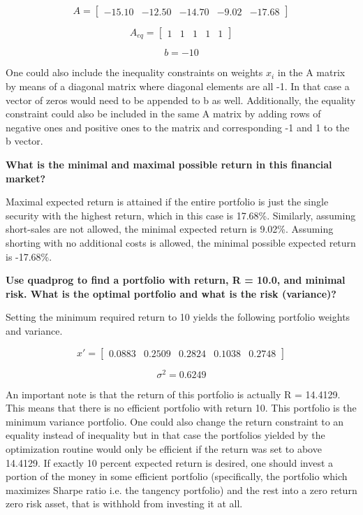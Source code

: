 \[A= \begin{bmatrix}
 	-15.10 & -12.50 & -14.70 & -9.02 & -17.68
\end{bmatrix}
\]

\[A_{eq}= \begin{bmatrix}
 	1 & 1 & 1 & 1 & 1 
\end{bmatrix}
\]

\[b=-10
\]

One could also include the inequality constraints on weights $x_i$ in the A matrix by means of a diagonal matrix where diagonal elements are all -1. In that case a vector of zeros would need to be appended to b as well. Additionally, the equality constraint could also be included in the same A matrix by adding rows of negative ones and positive ones to the matrix and corresponding -1 and 1 to the b vector. 

\textbf{What is the minimal and maximal possible return in this financial market?}

Maximal expected return is attained if the entire portfolio is just the single security with the highest return, which in this case is 17.68\%. Similarly, assuming short-sales are not allowed, the minimal expected return is 9.02\%. Assuming shorting with no additional costs is allowed, the minimal possible expected return is -17.68\%.

\textbf{Use quadprog to find a portfolio with return, R = 10.0, and minimal risk. What is the optimal portfolio and what is the risk (variance)?}

Setting the minimum required return to 10 yields the following portfolio weights and variance.

\[x'= \begin{bmatrix}
    0.0883 & 0.2509 & 0.2824 & 0.1038 & 0.2748
\end{bmatrix}
\]

\[\sigma^2 = 0.6249
\]

An important note is that the return of this portfolio is actually R = 14.4129. This means that there is no efficient portfolio with return 10. This portfolio is the minimum variance portfolio. One could also change the return constraint to an equality instead of inequality but in that case the portfolios yielded by the optimization routine would only be efficient if the return was set to above 14.4129. If exactly 10 percent expected return is desired, one should invest a portion of the money in some efficient portfolio (specifically, the portfolio which maximizes Sharpe ratio i.e. the tangency portfolio) and the rest into a zero return zero risk asset, that is withhold from investing it at all. 

